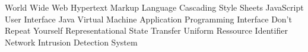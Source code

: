 \begin{acronym}[HTML]
			{World Wide Web}
			{Hypertext Markup Language}
			{Cascading Style Sheets}
			{JavaScript}
			{User Interface}
			{Java Virtual Machine}
   			{Application Programming Interface}
	      {Don't Repeat Yourself}
	     {Representational State Transfer}
	      {Uniform Ressource Identifier}
	     {Network Intrusion Detection System}
\end{acronym}

